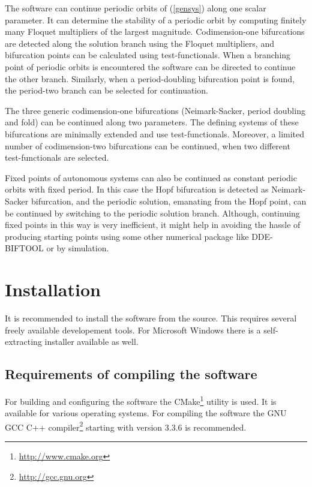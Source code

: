 \documentclass[10pt,a4paper]{ddedoc}
\begin{document}
The software can continue periodic orbits of (\ref{gensys}) along one scalar
parameter. It can determine the stability of a periodic orbit by computing
finitely many Floquet multipliers of the largest magnitude. Codimension-one
bifurcations are detected along the solution branch using the Floquet
multipliers, and bifurcation points can be calculated using test-functionals.
When a branching point of periodic orbits is encountered the software can be
directed to continue the other branch. Similarly, when a period-doubling
bifurcation point is found, the period-two branch can be selected for
continuation.

The three generic codimension-one bifurcations (Neimark-Sacker, period doubling
and fold) can be continued along two parameters. The defining systems of these
bifurcations are minimally extended and use test-functionals. Moreover, a
limited number of codimension-two bifurcations can be continued, when two
different test-functionals are selected.

Fixed points of autonomous systems can also be continued as constant periodic
orbits with fixed period. In this case the Hopf bifurcation is detected as
Neimark-Sacker bifurcation, and the periodic solution, emanating from the Hopf
point, can be continued by switching to the periodic solution branch.
Although, continuing fixed points in this way is very inefficient, it might help
in avoiding the hassle of producing starting points using some other numerical
package like DDE-BIFTOOL \cite{DDEBIF} or by simulation.

\section{Installation}

It is recommended to install the software from the source. This requires several freely
available developement tools. For Microsoft Windows there is a self-extracting installer
available as well.

\subsection{Requirements of compiling the software}

For building and configuring the software the CMake\footnote{\url{http://www.cmake.org}}
utility is used. It is available for various operating systems. For compiling 
the software the GNU GCC C++ compiler\footnote{\url{http://gcc.gnu.org}} starting with 
version 3.3.6 is recommended.
\end{document}
